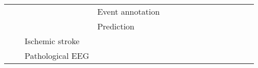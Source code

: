 \begin{tabular}{p{1.5cm}p{1.5cm}p{1.5cm}p{1.5cm}p{0.6cm}p{0.6cm}p{0.6cm}p{0.6cm}p{0.6cm}p{0.6cm}p{0.6cm}p{0.6cm}p{0.6cm}p{0.6cm}p{0.6cm}}
                                &                 &                   & Event annotation &                                                             &                                                                                                                             &                                                                        &                  &                                      &                                                            &                      &      \cite{Yang2016b} &                                 &                         &                                                                      \\
                                &                 &                   & Prediction &                                                             &                                                                                                 \cite{Truong2018, Page2016} &                                                                        &                  &                                      &                                                            &                      &                       &              \cite{Truong2018a} &                         &                                                  \cite{Tsiouris2018} \\
                                &                 & Ischemic stroke &   &                                                             &                                                                                                            \cite{Giri2016a} &                                                                        &                  &                                      &                                                            &                      &                       &                                 &                         &                                                                      \\
                                &                 & Pathological EEG &   &                                                             &                                                                                                   \cite{Schirrmeister2017a} &                                                         \cite{Roy2018} &                  &                                      &                                                            &                      &                       &                                 &                         &                                                                      \\

\end{tabular}
